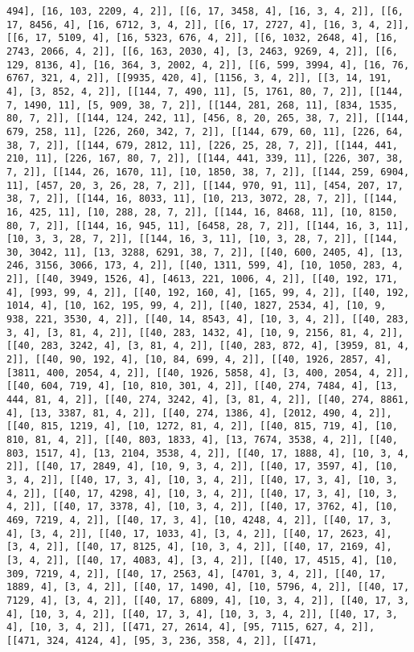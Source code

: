 \documentclass[12pt,fleqn]{article}\usepackage{../../common}
\begin{document}
\begin{verbatim}
494], [16, 103, 2209, 4, 2]], [[6, 17, 3458, 4], [16, 3, 4, 2]], [[6, 17, 8456, 4], [16, 6712, 3, 4, 2]], [[6, 17, 2727, 4], [16, 3, 4, 2]], [[6, 17, 5109, 4], [16, 5323, 676, 4, 2]], [[6, 1032, 2648, 4], [16, 2743, 2066, 4, 2]], [[6, 163, 2030, 4], [3, 2463, 9269, 4, 2]], [[6, 129, 8136, 4], [16, 364, 3, 2002, 4, 2]], [[6, 599, 3994, 4], [16, 76, 6767, 321, 4, 2]], [[9935, 420, 4], [1156, 3, 4, 2]], [[3, 14, 191, 4], [3, 852, 4, 2]], [[144, 7, 490, 11], [5, 1761, 80, 7, 2]], [[144, 7, 1490, 11], [5, 909, 38, 7, 2]], [[144, 281, 268, 11], [834, 1535, 80, 7, 2]], [[144, 124, 242, 11], [456, 8, 20, 265, 38, 7, 2]], [[144, 679, 258, 11], [226, 260, 342, 7, 2]], [[144, 679, 60, 11], [226, 64, 38, 7, 2]], [[144, 679, 2812, 11], [226, 25, 28, 7, 2]], [[144, 441, 210, 11], [226, 167, 80, 7, 2]], [[144, 441, 339, 11], [226, 307, 38, 7, 2]], [[144, 26, 1670, 11], [10, 1850, 38, 7, 2]], [[144, 259, 6904, 11], [457, 20, 3, 26, 28, 7, 2]], [[144, 970, 91, 11], [454, 207, 17, 38, 7, 2]], [[144, 16, 8033, 11], [10, 213, 3072, 28, 7, 2]], [[144, 16, 425, 11], [10, 288, 28, 7, 2]], [[144, 16, 8468, 11], [10, 8150, 80, 7, 2]], [[144, 16, 945, 11], [6458, 28, 7, 2]], [[144, 16, 3, 11], [10, 3, 3, 28, 7, 2]], [[144, 16, 3, 11], [10, 3, 28, 7, 2]], [[144, 30, 3042, 11], [13, 3288, 6291, 38, 7, 2]], [[40, 600, 2405, 4], [13, 246, 3156, 3066, 173, 4, 2]], [[40, 1311, 599, 4], [10, 1050, 283, 4, 2]], [[40, 3949, 1526, 4], [4613, 221, 1006, 4, 2]], [[40, 192, 171, 4], [993, 99, 4, 2]], [[40, 192, 160, 4], [165, 99, 4, 2]], [[40, 192, 1014, 4], [10, 162, 195, 99, 4, 2]], [[40, 1827, 2534, 4], [10, 9, 938, 221, 3530, 4, 2]], [[40, 14, 8543, 4], [10, 3, 4, 2]], [[40, 283, 3, 4], [3, 81, 4, 2]], [[40, 283, 1432, 4], [10, 9, 2156, 81, 4, 2]], [[40, 283, 3242, 4], [3, 81, 4, 2]], [[40, 283, 872, 4], [3959, 81, 4, 2]], [[40, 90, 192, 4], [10, 84, 699, 4, 2]], [[40, 1926, 2857, 4], [3811, 400, 2054, 4, 2]], [[40, 1926, 5858, 4], [3, 400, 2054, 4, 2]], [[40, 604, 719, 4], [10, 810, 301, 4, 2]], [[40, 274, 7484, 4], [13, 444, 81, 4, 2]], [[40, 274, 3242, 4], [3, 81, 4, 2]], [[40, 274, 8861, 4], [13, 3387, 81, 4, 2]], [[40, 274, 1386, 4], [2012, 490, 4, 2]], [[40, 815, 1219, 4], [10, 1272, 81, 4, 2]], [[40, 815, 719, 4], [10, 810, 81, 4, 2]], [[40, 803, 1833, 4], [13, 7674, 3538, 4, 2]], [[40, 803, 1517, 4], [13, 2104, 3538, 4, 2]], [[40, 17, 1888, 4], [10, 3, 4, 2]], [[40, 17, 2849, 4], [10, 9, 3, 4, 2]], [[40, 17, 3597, 4], [10, 3, 4, 2]], [[40, 17, 3, 4], [10, 3, 4, 2]], [[40, 17, 3, 4], [10, 3, 4, 2]], [[40, 17, 4298, 4], [10, 3, 4, 2]], [[40, 17, 3, 4], [10, 3, 4, 2]], [[40, 17, 3378, 4], [10, 3, 4, 2]], [[40, 17, 3762, 4], [10, 469, 7219, 4, 2]], [[40, 17, 3, 4], [10, 4248, 4, 2]], [[40, 17, 3, 4], [3, 4, 2]], [[40, 17, 1033, 4], [3, 4, 2]], [[40, 17, 2623, 4], [3, 4, 2]], [[40, 17, 8125, 4], [10, 3, 4, 2]], [[40, 17, 2169, 4], [3, 4, 2]], [[40, 17, 4083, 4], [3, 4, 2]], [[40, 17, 4515, 4], [10, 309, 7219, 4, 2]], [[40, 17, 2563, 4], [4701, 3, 4, 2]], [[40, 17, 1889, 4], [3, 4, 2]], [[40, 17, 1490, 4], [10, 5796, 4, 2]], [[40, 17, 7129, 4], [3, 4, 2]], [[40, 17, 6809, 4], [10, 3, 4, 2]], [[40, 17, 3, 4], [10, 3, 4, 2]], [[40, 17, 3, 4], [10, 3, 3, 4, 2]], [[40, 17, 3, 4], [10, 3, 4, 2]], [[471, 27, 2614, 4], [95, 7115, 627, 4, 2]], [[471, 324, 4124, 4], [95, 3, 236, 358, 4, 2]], [[471, 
\end{verbatim}
\end{document}
